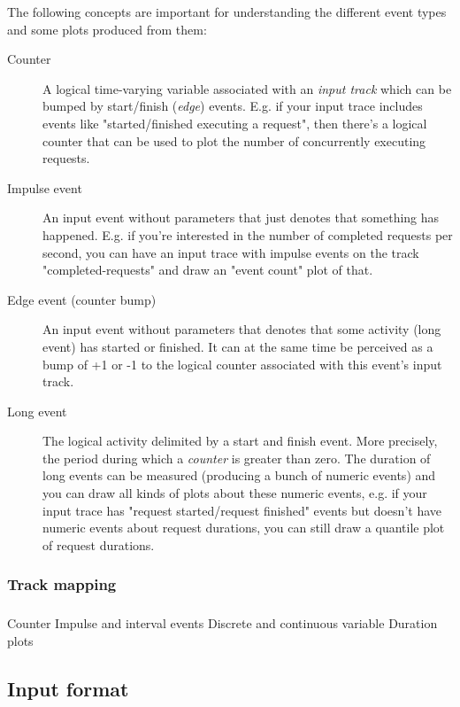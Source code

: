\documentclass{article}
\begin{document}
The following concepts are important for understanding the different event types and some plots produced from them:
\begin{description}
\item[Counter] A logical time-varying variable associated with an \emph{input track} which can be bumped by start/finish (\emph{edge}) events. E.g. if your input trace includes events like "started/finished executing a request", then there's a logical counter that can be used to plot the number of concurrently executing requests.
\item[Impulse event] An input event without parameters that just denotes that something has happened. E.g. if you're interested in the number of completed requests per second, you can have an input trace with impulse events on the track "completed-requests" and draw an "event count" plot of that.
\item[Edge event (counter bump)] An input event without parameters that denotes that some activity (long event) has started or finished. It can at the same time be perceived as a bump of +1 or -1 to the logical counter associated with this event's input track.
\item[Long event] The logical activity delimited by a start and finish event. More precisely, the period during which a \emph{counter} is greater than zero. The duration of long events can be measured (producing a bunch of numeric events) and you can draw all kinds of plots about these numeric events, e.g. if your input trace has "request started/request finished" events but doesn't have numeric events about request durations, you can still draw a quantile plot of request durations.
\end{description}

\subsubsection{Track mapping}
\label{sec:tplot-track-mapping}


\subsubsection{}
Counter
Impulse and interval events
Discrete and continuous variable
Duration plots


\subsection{Input format}
\label{sec:tplot-input-format}
\end{document}
